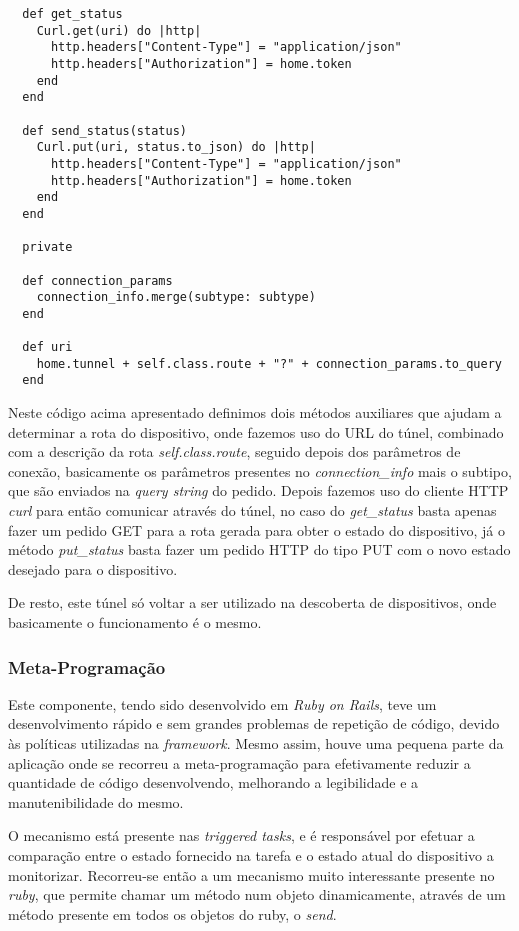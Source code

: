 \begin{verbatim}
  def get_status
    Curl.get(uri) do |http|
      http.headers["Content-Type"] = "application/json"
      http.headers["Authorization"] = home.token
    end
  end
  
  def send_status(status)
    Curl.put(uri, status.to_json) do |http|
      http.headers["Content-Type"] = "application/json"
      http.headers["Authorization"] = home.token
    end
  end
  
  private
  
  def connection_params
    connection_info.merge(subtype: subtype)
  end

  def uri
    home.tunnel + self.class.route + "?" + connection_params.to_query
  end
\end{verbatim}

Neste código acima apresentado definimos dois métodos auxiliares que ajudam a determinar a rota do dispositivo, onde fazemos uso do URL do túnel, combinado com a descrição da rota \textit{self.class.route}, seguido depois dos parâmetros de conexão, basicamente os parâmetros presentes no \textit{connection\_info} mais o subtipo, que são enviados na \textit{query string} do pedido. Depois fazemos uso do cliente HTTP \textit{curl} para então comunicar através do túnel, no caso do \textit{get\_status} basta apenas fazer um pedido GET para a rota gerada para obter o estado do dispositivo, já o método \textit{put\_status} basta fazer um pedido HTTP do tipo PUT com o novo estado desejado para o dispositivo. 

De resto, este túnel só voltar a ser utilizado na descoberta de dispositivos, onde basicamente o funcionamento é o mesmo.

\subsubsection{Meta-Programação}

Este componente, tendo sido desenvolvido em \textit{Ruby on Rails}, teve um desenvolvimento rápido e sem grandes problemas de repetição de código, devido às políticas utilizadas na \textit{framework}. Mesmo assim, houve uma pequena parte da aplicação onde se recorreu a meta-programação para efetivamente reduzir a quantidade de código desenvolvendo, melhorando a legibilidade e a manutenibilidade do mesmo.

O mecanismo está presente nas \textit{triggered tasks}, e é responsável por efetuar a comparação entre o estado fornecido na tarefa e o estado atual do dispositivo a monitorizar. Recorreu-se então a um mecanismo muito interessante presente no \textit{ruby}, que permite chamar um método num objeto dinamicamente, através de um método presente em todos os objetos do ruby, o \textit{send}.

